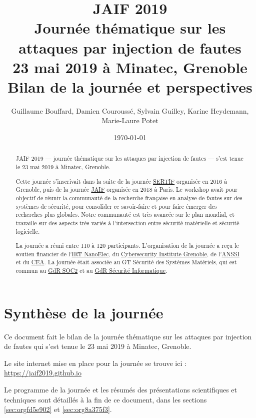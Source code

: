 \documentclass[a4paper,11pt]{article}
\author{Guillaume Bouffard,  Damien Couroussé, Sylvain Guilley,  Karine Heydemann, Marie-Laure Potet}
\date{\today}
\title{JAIF 2019 \\ Journée thématique sur les attaques par injection de fautes \\ 23 mai 2019 à Minatec, Grenoble\\\medskip
\large Bilan de la journée et perspectives}
\begin{document}
\maketitle
\setcounter{tocdepth}{1}
\tableofcontents

\begin{abstract}
JAIF 2019 --- journée thématique sur les attaques par injection de
fautes --- s'est tenue le 23 mai 2019 à Minatec, Grenoble.

Cette journée s’inscrivait dans la suite de la journée \href{https://lazart.gricad-pages.univ-grenoble-alpes.fr/sertif/pages/workshop.html}{SERTIF} organisée
en 2016 à Grenoble,
puis de la journée \href{https://wp-systeme.lip6.fr/jaif}{JAIF} organisée en 2018 à Paris.
Le workshop avait pour objectif de réunir la communauté de la
recherche française en analyse de fautes sur des systèmes de sécurité,
pour consolider ce savoir-faire et pour faire émerger des recherches
plus globales.  Notre communauté est très avancée sur le plan mondial,
et travaille sur des aspects très variés à l'intersection entre
sécurité matérielle et sécurité logicielle.

La journée a réuni entre 110 à 120 participants.  L'organisation de la
journée a reçu le soutien financier de l'\href{http://www.irtnanoelec.fr}{IRT NanoElec}, du
\href{https://cybersecurity.univ-grenoble-alpes.fr/}{Cybersecurity Institute Grenoble}, de l'\href{https://www.ssi.gouv.fr}{ANSSI} et du \href{http://www.cea-tech.fr}{CEA}.  La journée
était associée au GT Sécurité des Systèmes Matériels, qui est commun
au \href{http://www.gdr-soc.cnrs.fr}{GdR SOC2} et au \href{https://gdr-securite.irisa.fr}{GdR Sécurité Informatique}.
\end{abstract}

\section{Synthèse de la journée}
\label{sec:org33e6ef1}

Ce document fait le bilan de la journée thématique sur les attaques
par injection de fautes qui s'est tenue le 23 mai 2019 à Minatec, Grenoble.

Le site internet mise en place pour la journée se trouve ici :
\url{https://jaif2019.github.io}

Le programme de la journée et les résumés des présentations
scientifiques et techniques sont détaillés à la fin de ce document,
dans les sections \ref{sec:orgfd5e902} et \ref{sec:org8a375f3}.
\end{document}
